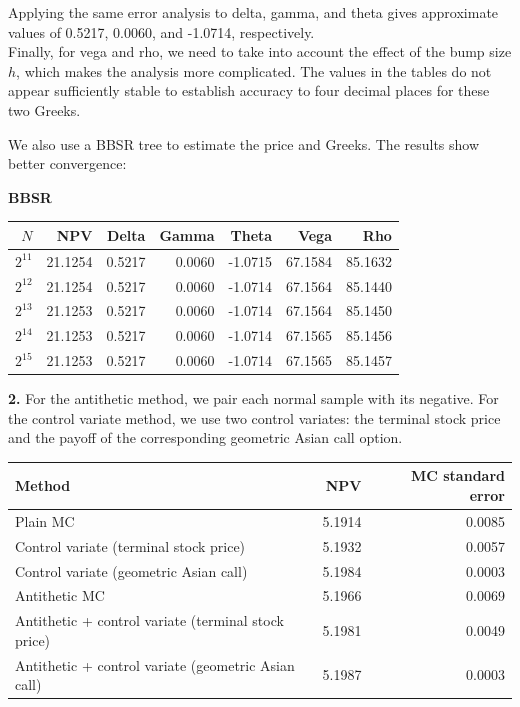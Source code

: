 \documentclass{article}
\begin{document}
\indent Applying the same error analysis to delta, gamma, and theta gives approximate values of 0.5217, 0.0060, and -1.0714, respectively.\\

\indent Finally, for vega and rho, we need to take into account the effect of the bump size $h$, which makes the analysis more complicated. The values in the tables do not appear sufficiently stable to establish accuracy to four decimal places for these two Greeks.\\

\newpage

We also use a BBSR tree to estimate the price and Greeks. The results show better convergence:

\begin{center}
\textbf{BBSR}\\[0.5em]
\begin{tabular}{rrrrrrr}
    \hline
    $N$ & NPV & Delta & Gamma & Theta & Vega & Rho \\
    \hline
    $2^{11}$ & 21.1254 & 0.5217 & 0.0060 & -1.0715 & 67.1584 & 85.1632 \\
    $2^{12}$ & 21.1254 & 0.5217 & 0.0060 & -1.0714 & 67.1564 & 85.1440 \\
    $2^{13}$ & 21.1253 & 0.5217 & 0.0060 & -1.0714 & 67.1564 & 85.1450 \\
    $2^{14}$ & 21.1253 & 0.5217 & 0.0060 & -1.0714 & 67.1565 & 85.1456 \\
    $2^{15}$ & 21.1253 & 0.5217 & 0.0060 & -1.0714 & 67.1565 & 85.1457 \\
    \hline
\end{tabular}
\end{center}

\medskip
\noindent\textbf{2.} For the antithetic method, we pair each normal sample with its negative.
For the control variate method, we use two control variates: the terminal stock price and the payoff of the corresponding geometric Asian call option.

\begin{center}
\begin{tabular}{lrr}
    \hline
    Method & NPV & MC standard error \\
    \hline
    Plain MC & 5.1914 & 0.0085 \\
    Control variate (terminal stock price) & 5.1932 & 0.0057 \\
    Control variate (geometric Asian call) & 5.1984 & 0.0003 \\
    Antithetic MC & 5.1966 & 0.0069 \\
    Antithetic + control variate (terminal stock price) & 5.1981 & 0.0049 \\
    Antithetic + control variate (geometric Asian call) & 5.1987 & 0.0003 \\
    \hline
\end{tabular}
\end{center}
\end{document}
